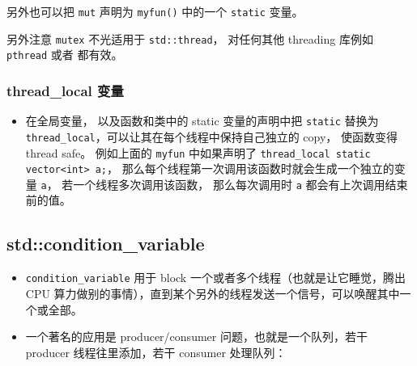 另外也可以把 \verb`mut` 声明为 \verb`myfun()` 中的一个 \verb`static` 变量。

另外注意 \verb`mutex` 不光适用于 \verb`std::thread`， 对任何其他 threading 库例如 \verb`pthread` 或者  都有效。


\subsubsection{thread\_local 变量}
\begin{itemize}
\item 在全局变量， 以及函数和类中的 static 变量的声明中把 \verb`static` 替换为 \verb`thread_local`，可以让其在每个线程中保持自己独立的 copy， 使函数变得 thread safe。 例如上面的 \verb`myfun` 中如果声明了 \verb`thread_local static vector<int> a;`， 那么每个线程第一次调用该函数时就会生成一个独立的变量 \verb`a`， 若一个线程多次调用该函数， 那么每次调用时 \verb`a` 都会有上次调用结束前的值。
\end{itemize}

\subsection{std::condition\_variable}
\begin{itemize}
\item \verb`condition_variable` 用于 block 一个或者多个线程（也就是让它睡觉，腾出 CPU 算力做别的事情），直到某个另外的线程发送一个信号，可以唤醒其中一个或全部。
\item 一个著名的应用是 producer/consumer 问题，也就是一个队列，若干 producer 线程往里添加，若干 consumer 处理队列：
\end{itemize}

